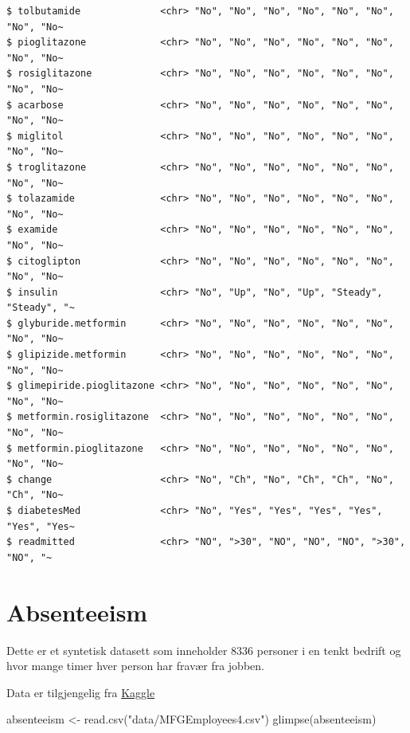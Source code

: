 \documentclass[
  letterpaper,
  DIV=11,
  numbers=noendperiod]{scrreprt}
\newenvironment{Shaded}{\begin{snugshade}}{\end{snugshade}}
\newcommand{\FunctionTok}[1]{\textcolor[rgb]{0.28,0.35,0.67}{#1}}
\newcommand{\NormalTok}[1]{\textcolor[rgb]{0.00,0.23,0.31}{#1}}
\newcommand{\OtherTok}[1]{\textcolor[rgb]{0.00,0.23,0.31}{#1}}
\newcommand{\StringTok}[1]{\textcolor[rgb]{0.13,0.47,0.30}{#1}}
\theoremstyle{definition}
\theoremstyle{remark}
\begin{document}
\begin{verbatim}
$ tolbutamide              <chr> "No", "No", "No", "No", "No", "No", "No", "No~
$ pioglitazone             <chr> "No", "No", "No", "No", "No", "No", "No", "No~
$ rosiglitazone            <chr> "No", "No", "No", "No", "No", "No", "No", "No~
$ acarbose                 <chr> "No", "No", "No", "No", "No", "No", "No", "No~
$ miglitol                 <chr> "No", "No", "No", "No", "No", "No", "No", "No~
$ troglitazone             <chr> "No", "No", "No", "No", "No", "No", "No", "No~
$ tolazamide               <chr> "No", "No", "No", "No", "No", "No", "No", "No~
$ examide                  <chr> "No", "No", "No", "No", "No", "No", "No", "No~
$ citoglipton              <chr> "No", "No", "No", "No", "No", "No", "No", "No~
$ insulin                  <chr> "No", "Up", "No", "Up", "Steady", "Steady", "~
$ glyburide.metformin      <chr> "No", "No", "No", "No", "No", "No", "No", "No~
$ glipizide.metformin      <chr> "No", "No", "No", "No", "No", "No", "No", "No~
$ glimepiride.pioglitazone <chr> "No", "No", "No", "No", "No", "No", "No", "No~
$ metformin.rosiglitazone  <chr> "No", "No", "No", "No", "No", "No", "No", "No~
$ metformin.pioglitazone   <chr> "No", "No", "No", "No", "No", "No", "No", "No~
$ change                   <chr> "No", "Ch", "No", "Ch", "Ch", "No", "Ch", "No~
$ diabetesMed              <chr> "No", "Yes", "Yes", "Yes", "Yes", "Yes", "Yes~
$ readmitted               <chr> "NO", ">30", "NO", "NO", "NO", ">30", "NO", "~
\end{verbatim}

\hypertarget{absenteeism}{%
\section{Absenteeism}\label{absenteeism}}

Dette er et syntetisk datasett som inneholder 8336 personer i en tenkt
bedrift og hvor mange timer hver person har fravær fra jobben.

Data er tilgjengelig fra
\href{https://www.kaggle.com/datasets/HRAnalyticRepository/absenteeism-dataset}{Kaggle}

\begin{Shaded}
\begin{Highlighting}[]
\NormalTok{absenteeism }\OtherTok{\textless{}{-}} \FunctionTok{read.csv}\NormalTok{(}\StringTok{"data/MFGEmployees4.csv"}\NormalTok{)}
\FunctionTok{glimpse}\NormalTok{(absenteeism)}
\end{Highlighting}
\end{Shaded}
\end{document}
